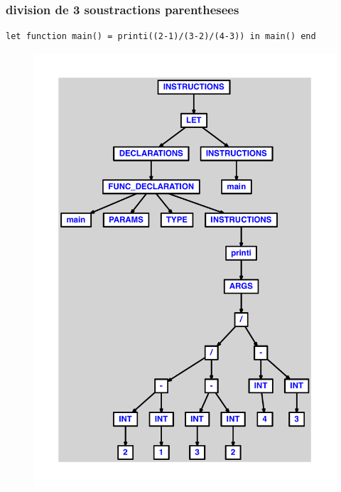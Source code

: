 \documentclass{article}
\begin{document}
\subsubsection{division de 3 soustractions parenthesees}
\begin{lstlisting}
let function main() = printi((2-1)/(3-2)/(4-3)) in main() end
\end{lstlisting}
\newpage
\begin{figure}[H]
\centering
\includegraphics[max width=\textwidth]{ast/ast_106.pdf}
\end{figure}
\newpage
\end{document}
